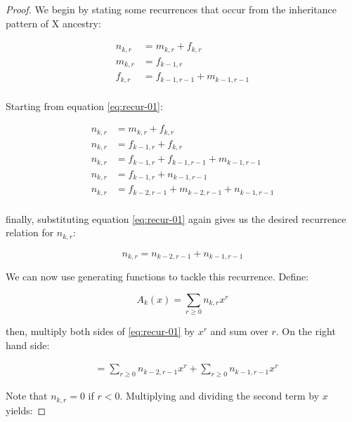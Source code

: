 \documentclass[9pt,twocolumn,twoside]{gsajnl}
\begin{document}
\begin{proof}

 We begin by stating some recurrences that occur from the inheritance pattern of
 X ancestry:

\begin{subequations}
  \label{eq:gen-recur}
  \begin{align}
    n_{k,r} &= m_{k,r} + f_{k,r} \label{eq:recur-01}\\
    m_{k,r} &= f_{k-1,r} \label{eq:recur-02}\\
    f_{k,r} &= f_{k-1, r-1} + m_{k-1,r-1} \label{eq:recur-03}\\
  \end{align}
\end{subequations}

Starting from equation \eqref{eq:recur-01}:

\begin{align*} 
   n_{k,r} &= m_{k,r} + f_{k,r} \\
   n_{k,r} &= f_{k-1,r} + f_{k,r} \\
   n_{k,r} &= f_{k-1,r} + f_{k-1, r-1} + m_{k-1,r-1} \\
   n_{k,r} &= f_{k-1,r} + n_{k-1, r-1} \\
   n_{k,r} &= f_{k-2, r-1} + m_{k-2,r-1} + n_{k-1, r-1} \\
\end{align*}

finally, substituting equation \eqref{eq:recur-01} again gives us the desired
recurrence relation for $n_{k,r}$:

\begin{equation*} 
  \label{eq:recur-01}
   n_{k,r} = n_{k-2, r-1} + n_{k-1, r-1}
\end{equation*}

We can now use generating functions \citep{wilf2013generatingfunctionology} to
tackle this recurrence. Define:

\begin{equation*}
  A_k(x) = \sum_{r \ge 0} n_{k,r} x^r
\end{equation*}

then, multiply both sides of \eqref{eq:recur-01} by $x^r$ and sum over $r$. On
the right hand side:

\begin{align*}
  &= \sum_{r \ge 0} n_{k-2, r-1} x^r + \sum_{r \ge 0} n_{k-1, r-1} x^r
\end{align*}

 Note that $n_{k,r} = 0$ if $r < 0$. Multiplying and dividing the second term by
 $x$ yields:


\end{proof}
\end{document}
